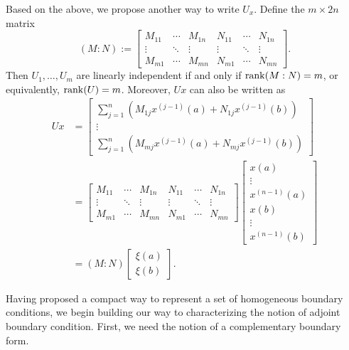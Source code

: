 \documentclass[11pt, oneside, a4paper]{article}
\begin{document}
Based on the above, we propose another way to write $U_x$. Define the $m\times 2n$ matrix
\[(M:N):=\begin{bmatrix}
    M_{11} & \cdots & M_{1n} & N_{11} & \cdots & N_{1n}\\
    \vdots & \ddots & \vdots & \vdots & \ddots & \vdots\\
    M_{m1} & \cdots & M_{mn} & N_{m1} & \cdots & N_{mn}
\end{bmatrix}.\]
Then $U_1,\ldots,U_m$ are linearly independent if and only if $\operatorname{rank}(M:N)=m$, or equivalently, $\operatorname{rank}(U)=m$. 
Moreover, $Ux$ can also be written as
\begin{align*}
    Ux &= \begin{bmatrix}
        \sum_{j=1}^n (M_{1j}x^{(j-1)}(a) + N_{1j}x^{(j-1)}(b))\\
        \vdots\\
        \sum_{j=1}^n (M_{mj}x^{(j-1)}(a) + N_{mj}x^{(j-1)}(b))
    \end{bmatrix}\\
    &= \begin{bmatrix}
        M_{11} & \cdots & M_{1n} & N_{11} & \cdots & N_{1n}\\
        \vdots & \ddots & \vdots & \vdots & \ddots & \vdots\\
        M_{m1} & \cdots & M_{mn} & N_{m1} & \cdots & N_{mn}
    \end{bmatrix} \begin{bmatrix}x(a)\\\vdots\\x^{(n-1)}(a)\\ x(b)\\\vdots\\x^{(n-1)}(b)\end{bmatrix}\\
    &= (M:N)\begin{bmatrix}
        \xi(a)\\
        \xi(b)
    \end{bmatrix}.
\end{align*}

Having proposed a compact way to represent a set of homogeneous boundary conditions, we begin building our way to characterizing the notion of adjoint boundary condition. First, we need the notion of a complementary boundary form.
\end{document}

